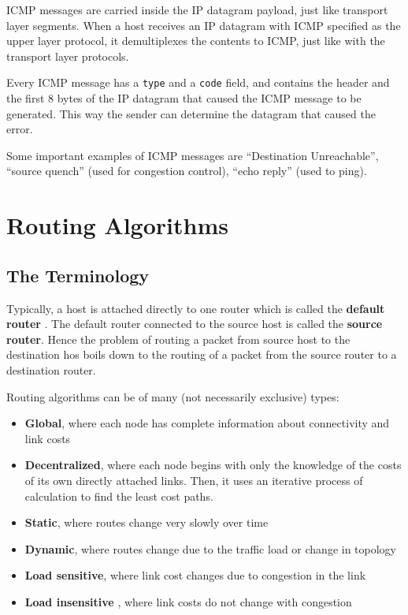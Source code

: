 \documentclass[12pt,letterpaper]{book}
\theoremstyle{definition}
\begin{document}
ICMP messages are carried inside the IP datagram payload, just like transport layer segments. When a host receives an IP datagram with ICMP specified as the upper layer protocol, it demultiplexes the contents to ICMP, just like with the transport layer protocols.

Every ICMP message has a \texttt{type} and a \texttt{code} field, and contains the header and the first 8 bytes of the IP datagram that caused the ICMP message to be generated. This way the sender can determine the datagram that caused the error.

Some important examples of ICMP messages are ``Destination Unreachable'', ``source quench'' (used for congestion control), ``echo reply'' (used to ping).

\section{Routing Algorithms}

\subsection{The Terminology}

Typically, a host is attached directly to one router which is called the \textbf{default router} . The default router connected to the source host is called the \textbf{source router}. Hence the problem of routing a packet from source host to the destination hos boils down to the routing of a packet from the source router to a destination router.

Routing algorithms can be of many (not necessarily exclusive) types:
\begin{itemize}
  \item \textbf{Global}, where each node has complete information about connectivity and link costs
  \item \textbf{Decentralized}, where each node begins with only the knowledge of the costs of its own directly attached links. Then, it uses an iterative process of calculation to find the least cost paths.
  \item \textbf{Static}, where routes change very slowly over time
  \item \textbf{Dynamic}, where routes change due to the traffic load or change in topology
  \item \textbf{Load sensitive}, where link cost changes due to congestion in the link
  \item \textbf{Load insensitive} , where link costs do not change with congestion
\end{itemize}
\end{document}
